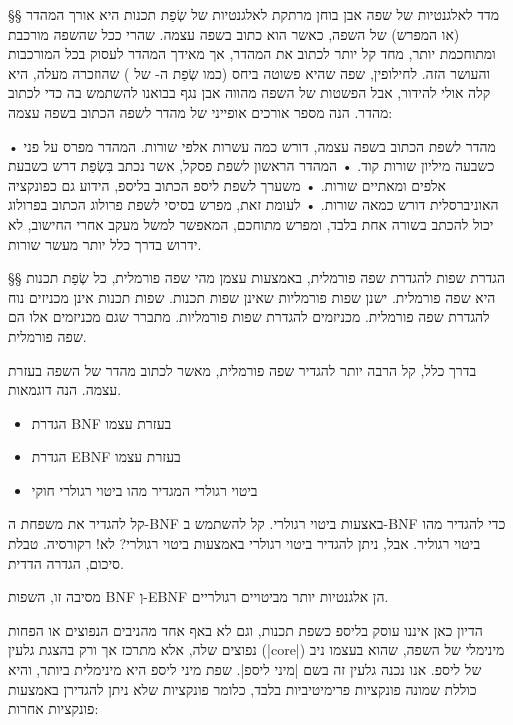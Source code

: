 §§ מדד לאלגנטיות של שפה
אבן בוחן מרתקת לאלגנטיות של שְׂפַת תכנות היא אורך המהדר (או המפרש) של השפה, כאשר
הוא כתוב בשפה עצמה. שהרי ככל שהשפה מורכבת ומתוחכמת יותר, מחד קל יותר לכתוב את
המהדר, אך מאידך המהדר לעסוק בכל המורכבות והעושר הזה. לחילופין, שפה שהיא פשוטה
ביחס (כמו שְׂפַת ה- של ) שהוזכרה מעלה, היא קלה אולי להידור, אבל
הפשטות של השפה מהווה אבן נגף בבואנו להשתמש בה כדי לכתוב מהדר.
הנה מספר אורכים אופייני של מהדר לשפה הכתוב בשפה עצמה:
\begin{enumerate}
  • מהדר לשפת  הכתוב בשפה עצמה, דורש כמה עשרות אלפי שורות. המהדר  מפרס
  על פני כשבעה מיליון שורות קוד.
  • המהדר הראשון לשפת פסקל, אשר נכתב בִּשְׂפַת  דרש כשבעת אלפים ומאתיים שורות.
  • משערך לשפת ליספ הכתוב בליספ, הידוע גם כפונקציה האוניברסלית  דורש
  כמאה שורות.
  • לעומת זאת, מפרש בסיסי לשפת פרולוג הכתוב בפרולוג יכול להכתב בשורה אחת בלבד,
  ומפרש מתוחכם, המאפשר למשל מעקב אחרי החישוב, לא ידרוש בדרך כלל יותר מעשר שורות.
\end{enumerate}

§§ הגדרת שפות להגדרת שפה פורמלית, באמצעות עצמן
מהי שפה פורמלית, כל שְׂפַת תכנות היא שפה פורמלית. ישנן שפות פורמליות שאינן שפות
תכנות.  שפות תכנות אינן מכניזים נוח להגדרת שפה פורמלית.  מכניזמים להגדרת שפות
פורמליות. מתברר שגם מכניזמים אלו הם שפה פורמלית.

בדרך כלל, קל הרבה יותר להגדיר שפה פורמלית, מאשר לכתוב מהדר של השפה בעזרת עצמה.
הנה דוגמאות.
\begin{itemize}

  \item הגדרת BNF בעזרת עצמו

  \item הגדרת EBNF בעזרת עצמו

  \item ביטוי רגולרי המגדיר מהו ביטוי רגולרי חוקי
\end{itemize}
קל להגדיר את משפחת ה-BNF באצעות ביטוי רגולרי.
קל להשתמש ב-BNF כדי להגדיר מהו ביטוי רגוליר.
אבל, ניתן להגדיר ביטוי רגולרי באמצעות ביטוי רגולרי? לא! רקורסיה.
טבלת סיכום, הגדרה הדדית.

מסיבה זו, השפות BNF וְ-EBNF הן אלגנטיות יותר מביטויים רגולריים.

הדיון כאן איננו עוסק בליספ כשפת תכנות, וגם לא באף אחד מהניבים הנפוצים או הפחות
נפוצים שלה, אלא מתרכז אך ורק בהצגת גלעין (\E|core|) מינימלי של השפה, שהוא בעצמו
ניב של ליספ. אנו נכנה גלעין זה בשם \ע|מיני ליספ|. שפת מיני ליספ היא מינימלית
ביותר, והיא כוללת שמונה פונקציות פרימיטיביות בלבד, כלומר פונקציות שלא ניתן
להגדירן באמצעות פונקציות אחרות:

